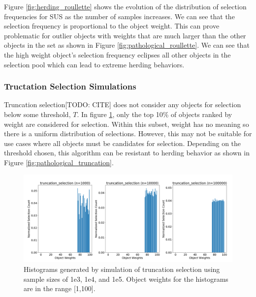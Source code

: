 \documentclass[12pt]{article}
\begin{document}
    Figure \ref{fig:herding_roullette} shows the evolution of the
    distribution of selection frequencies for SUS as the number of samples
    increases. We can see that the selection frequency is proportional to the
    object weight. This can prove problematic for outlier objects with weights
    that are much larger than the other objects in the set as shown in Figure
    \ref{fig:pathological_roullette}. We can see that the high weight object's
    selection frequency eclipses all other objects in the selection pool which
    can lead to extreme herding behaviors.

    \subsubsection{Tructation Selection Simulations}
    Truncation selection[TODO: CITE] does not consider any objects for
    selection below some threshold, $T$. In figure
    \ref{fig:herding_truncation}, only the top 10\% of objects ranked by weight
    are considered for selection. Within this subset, weight has no meaning so
    there is a uniform distribution of selections. However, this may not be
    suitable for use cases where all objects must be candidates for selection.
    Depending on the threshold chosen, this algorithm can be resistant to
    herding behavior as shown in Figure \ref{fig:pathological_truncation}. 

    \begin{figure}[h]
      \centering
      \includegraphics[scale=0.30]{images/herding_truncation.png} 
      \caption{Histograms generated by simulation of truncation selection
               using sample sizes of 1e3, 1e4, and 1e5. Object weights
               for the histograms are in the range [1,100].}
      \label{fig:herding_truncation}
    \end{figure}
\end{document}
